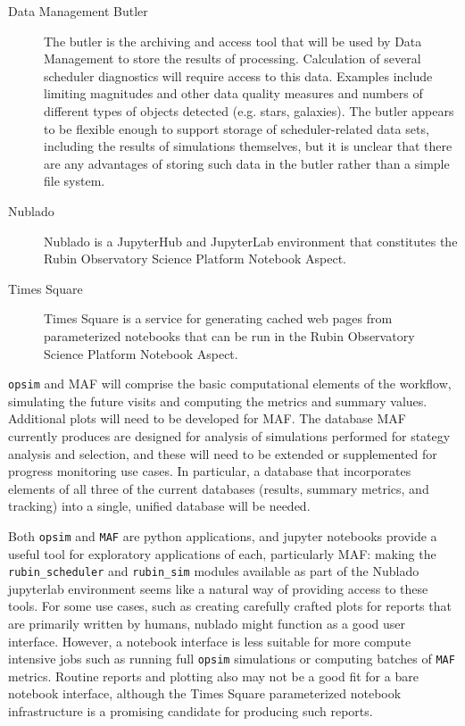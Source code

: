 \begin{description}
\item[{Data Management Butler}] The butler is the archiving and access tool that will be used by Data Management to store the results of processing. Calculation of several scheduler diagnostics will require access to this data. Examples include limiting magnitudes and other data quality measures and numbers of different types of objects detected (e.g. stars, galaxies). The butler appears to be flexible enough to support storage of scheduler-related data sets, including the results of simulations themselves, but it is unclear that there are any advantages of storing such data in the butler rather than a simple file system.
\item[{Nublado}] Nublado is a JupyterHub and JupyterLab environment that constitutes the Rubin Observatory Science Platform Notebook Aspect.
\item[{Times Square}] Times Square is a service for generating cached web pages from parameterized notebooks that can be run in the Rubin Observatory Science Platform Notebook Aspect.
\end{description}

\texttt{opsim} and MAF will comprise the basic computational elements of the workflow, simulating the future visits and computing the metrics and summary values. Additional plots will need to be developed for MAF. The database MAF currently produces are designed for analysis of simulations performed for stategy analysis and selection, and these will need to be extended or supplemented for progress monitoring use cases. In particular, a database that incorporates elements of all three of the current databases (results, summary metrics, and tracking) into a single, unified database will be needed.

Both \texttt{opsim} and \texttt{MAF} are python applications, and jupyter notebooks provide a useful tool for exploratory applications of each, particularly MAF: making the \texttt{rubin\_scheduler} and \texttt{rubin\_sim} modules available as part of the Nublado jupyterlab environment seems like a natural way of providing access to these tools. For some use cases, such as creating carefully crafted plots for reports that are primarily written by humans, nublado might function as a good user interface. However, a notebook interface is less suitable for more compute intensive jobs such as running full \texttt{opsim} simulations or computing batches of \texttt{MAF} metrics. Routine reports and plotting also may not be a good fit for a bare notebook interface, although the Times Square parameterized notebook infrastructure is a promising candidate for producing such reports.
